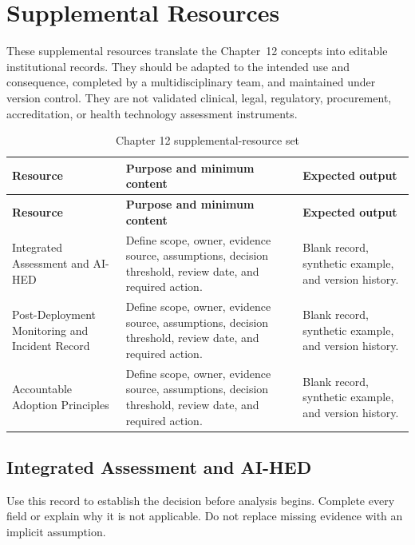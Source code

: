 \section{Supplemental Resources}
\label{sec:comp-ch12-supplemental}

These supplemental resources translate the Chapter~12 concepts into editable
institutional records. They should be adapted to the intended use and consequence,
completed by a multidisciplinary team, and maintained under version control. They
are not validated clinical, legal, regulatory, procurement, accreditation, or health
technology assessment instruments.

\begin{longtable}{@{}p{}p{}p{}@{}}
\caption{Chapter 12 supplemental-resource set}
\label{tab:comp-ch12-supplemental-set}\\
\toprule
\textbf{Resource} & \textbf{Purpose and minimum content} & \textbf{Expected output} \\
\midrule
\endfirsthead
\toprule
\textbf{Resource} & \textbf{Purpose and minimum content} & \textbf{Expected output} \\
\midrule
\endhead
\bottomrule
\endlastfoot
Integrated Assessment and AI-HED & Define scope, owner, evidence source, assumptions, decision threshold, review date, and required action. & Blank record, synthetic example, and version history. \\
Post-Deployment Monitoring and Incident Record & Define scope, owner, evidence source, assumptions, decision threshold, review date, and required action. & Blank record, synthetic example, and version history. \\
Accountable Adoption Principles & Define scope, owner, evidence source, assumptions, decision threshold, review date, and required action. & Blank record, synthetic example, and version history. \\
\end{longtable}

\subsection{Integrated Assessment and AI-HED}
\label{sec:comp-ch12-supp-1}
Use this record to establish the decision before analysis begins. Complete every
field or explain why it is not applicable. Do not replace missing evidence with an
implicit assumption.

